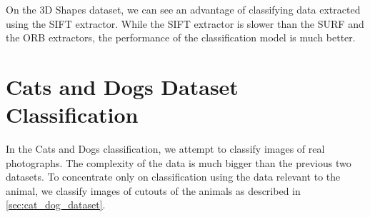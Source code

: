 On the 3D Shapes dataset, we can see an advantage of classifying data extracted using the SIFT extractor. While the SIFT extractor is slower than the SURF and the ORB extractors, the performance of the classification model is much better.

\section{Cats and Dogs Dataset Classification}
In the Cats and Dogs classification, we attempt to classify images of real photographs. The complexity of the data is much bigger than the previous two datasets. To concentrate only on classification using the data relevant to the animal, we classify images of cutouts of the animals as described in \ref{sec:cat_dog_dataset}.

